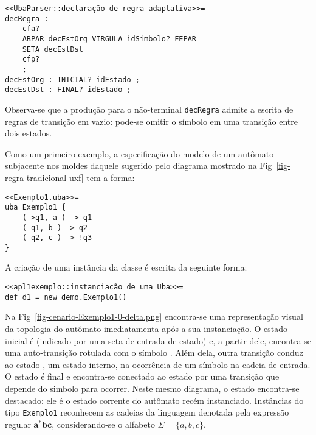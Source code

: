 \begin{lstlisting}[style=antlr]
<<UbaParser::declaração de regra adaptativa>>=
decRegra :
	cfa?
	ABPAR decEstOrg VIRGULA idSimbolo? FEPAR
	SETA decEstDst
	cfp?
	;
decEstOrg : INICIAL? idEstado ;
decEstDst : FINAL? idEstado ;
\end{lstlisting}

\noindent
Observa-se que a produção para o não-terminal \lstinline[style=antlr]!decRegra! admite a escrita de regras de transição em vazio: pode-se omitir o símbolo em uma transição entre dois estados.

Como um primeiro exemplo, a especificação do modelo de um autômato subjacente nos moldes daquele sugerido pelo diagrama mostrado na Fig~\ref{fig-regra-tradicional-uxf} tem a forma:

\begin{lstlisting}
<<Exemplo1.uba>>=
uba Exemplo1 {
	( >q1, a ) -> q1
	( q1, b ) -> q2
	( q2, c ) -> !q3
}
\end{lstlisting}

\noindent
A criação de uma instância  da classe  é escrita da seguinte forma:

\begin{lstlisting}
<<apl1exemplo::instanciação de uma Uba>>=
def d1 = new demo.Exemplo1()
\end{lstlisting}

\noindent
Na Fig~\ref{fig-cenario-Exemplo1-0-delta.png} encontra-se uma representação visual da topologia do autômato imediatamenta após a sua instanciação. O estado inicial é  (indicado por uma seta de entrada de estado) e, a partir dele, encontra-se uma auto-transição rotulada com o símbolo . Além dela, outra transição conduz ao estado , um estado interno, na ocorrência de um símbolo  na cadeia de entrada. O estado  é final e encontra-se conectado ao estado  por uma transição que depende do simbolo  para ocorrer. Neste mesmo diagrama, o estado  encontra-se destacado: ele é o estado corrente do autômato recém instanciado. Instâncias do tipo \lstinline!Exemplo1! reconhecem as cadeias da linguagem denotada pela expressão regular $\mathbf{a^*bc}$, considerando-se o alfabeto $\Sigma=\{a, b, c\}$.


